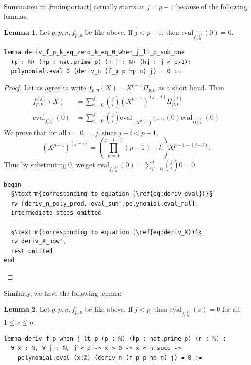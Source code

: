 \documentclass{report}
\theoremstyle{definition}
\newtheorem{lemma}{Lemma}[section]
\begin{document}
Summation in \ref{fm:important} actually starts at $j=p-1$ because of the following lemmas.
\begin{lemma}\label{lemma:j_lt_p_sub_one}
Let $g,p,n,f_{p,n}$ be like above. If $j < p-1$, then $\mathrm{eval}_{f_{p,n}^{(j)}}(0) = 0$.

\begin{verbatim}
lemma deriv_f_p_k_eq_zero_k_eq_0_when_j_lt_p_sub_one 
  (p : ℕ) (hp : nat.prime p) (n j : ℕ) (hj : j < p-1): 
  polynomial.eval 0 (deriv_n (f_p p hp n) j) = 0 :=
\end{verbatim}
\end{lemma}
\begin{proof}
Let us agree to write $f_{p,n}(X)=X^{p-1}\Pi_{p,n}$ as a short hand. Then 
\begin{equation}\label{eq:deriv_eval}
\begin{aligned}
f_{p,n}^{(j)}(X)&=\sum_{i=0}^j{j\choose i}(X^{p-1})^{(j-i)}\Pi_{p,n}^{(i)} \\
\mathrm{eval}_{f_{p,n}^{(j)}}(0)&=\sum_{i=0}^j{j\choose i}\mathrm{eval}_{(X^{p-1})^{(j-i)}}(0)\mathrm{eval}_{\Pi_{p,n}^{(i)}}(0)
\end{aligned}
\end{equation}
We prove that for all $i=0,\dots,j$, since $j-i<p-1$,
\begin{equation}\label{eq:deriv_X}
(X^{p-1})^{(j-i)}=\left(\prod_{k=0}^{j-i-1}{(p-1)-k}\right){X^{p-1-(j-i)}}. 
\end{equation}
Thus by substituting $0$, we get $\mathrm{eval}_{f_{p,n}^{(j)}}(0)=\sum_{i=0}^j{j\choose i}0=0$ 
\begin{verbatim}
begin
  §\textrm{corresponding to equation (\ref{eq:deriv_eval})}§
  rw [deriv_n_poly_prod, eval_sum',polynomial.eval_mul], 
  intermediate_steps_omitted

  §\textrm{corresponding to equation (\ref{eq:deriv_X})}§
  rw deriv_X_pow',
  rest_omitted
end
\end{verbatim}
\end{proof}

Similarly, we have the following lemma:
\begin{lemma}\label{lemma:lt_p_k_ge_1}
Let $g,p,n,f_{p,n}$ be like above. If $j < p$, then $\mathrm{eval}_{f_{p,n}^{(j)}}(x) = 0$ for all $1\le x\le n$.
\begin{verbatim}
lemma deriv_f_p_when_j_lt_p (p : ℕ) (hp : nat.prime p) (n : ℕ) : 
  ∀ x : ℕ, ∀ j : ℕ, j < p -> x > 0 -> x < n.succ -> 
    polynomial.eval (x:ℤ) (deriv_n (f_p p hp n) j) = 0 :=
\end{verbatim}
\end{lemma}
\end{document}
